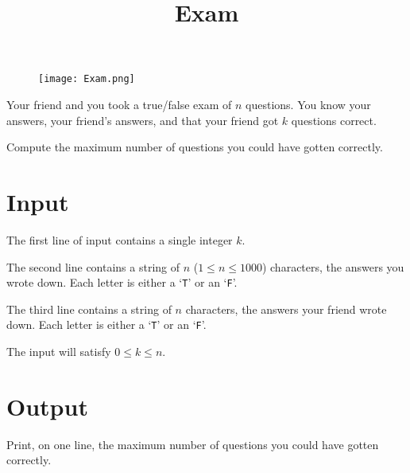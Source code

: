 \documentclass{article}
\title{Exam}
\date{}
\begin{document}
\maketitle
\begin{figure}[h!]
\centering
\texttt{[image: Exam.png]}
\end{figure}


Your friend and you took a true/false exam of $n$ questions.
You know your answers, your friend's answers, and that your friend got
$k$ questions correct.

Compute the maximum number of questions you could have gotten correctly.

\section{Input}

The first line of input contains a single integer $k$.

The second line contains a string of $n$ ($1 \le n \le 1000$) characters, the answers you wrote down. Each letter is either a `{\tt T}' or an `{\tt F}'.

The third line contains a string of $n$ characters, the answers your friend
wrote down. Each letter is either a `{\tt T}' or an `{\tt F}'.

The input will satisfy $0 \le k \le n$.

\section{Output}

Print, on one line, the maximum number of questions you could have gotten
correctly.

\end{document}
